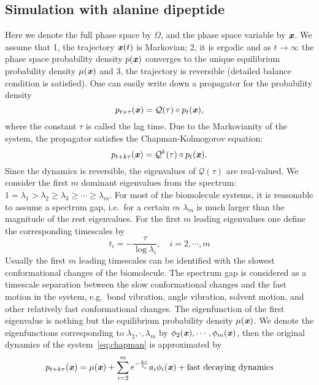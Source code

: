 \documentclass[aip,jcp,a4paper,preprint,unsortedaddress,onecolumn,fleqn]{revtex4-1}
\newcommand{\vect}[1]{\textbf{\textit{#1}}}
\begin{document}
\subsection{Simulation with alanine dipeptide}

Here we denote the full phase space by $\Omega$, and the phase space
variable by $\vect x$. We assume that 1, the trajectory $\vect x(t)$
is Markovian; 2, it is ergodic and as $t\rightarrow\infty$ the phase
space probability density $p(\vect x)$ converges to the unique
equilibrium probability density $\mu(\vect x)$ and 3, the trajectory
is reversible (detailed balance condition is satisfied). One can
easily write down a propagator for the probability density
\begin{equation}
\label{eq:propagator}  
p_{t+\tau}(\vect x) = \mathcal Q(\tau)\circ
p_t(\vect x),
\end{equation}
where the constant $\tau$ is called the lag time. Due to the
Markovianity of the system, the propagator satisfies the
Chapman-Kolmogorov equation:
\begin{equation}
  \label{eq:chapman}
  p_{t+k\tau}(\vect x) = \mathcal Q^k(\tau)\circ p_t(\vect x).
\end{equation}
Since the dynamics is reversible, the eigenvalues of $\mathcal
Q(\tau)$ are real-valued. We consider the first $m$ dominant
eigenvalues from the spectrum: $1 = \lambda_1 > \lambda_2 \geq
\lambda_3 \geq \cdots \geq \lambda_m$. For most of the biomolecule
systems, it is reasonable to assume a spectrum gap, i.e.~for a certain
$m$ $\lambda_m$ is much larger than the magnitude of the rest
eigenvalues. For the first $m$ leading eigenvalues one define the
corresponding timescales by
\begin{equation}
  \label{eq:timescale}
  t_i = -\frac{\tau}{\log \lambda_i}, \quad i= 2,\cdots, m
\end{equation}
Usually the first $m$ leading timescales can be identified with the
slowest conformational changes of the biomolecule. The spectrum gap is
considered as a timescale separation between the slow conformational
changes and the fast motion in the system, e.g.~bond vibration, angle
vibration, solvent motion, and other relatively fast conformational
changes. The eigenfunction of the first eigenvalue is nothing but the
equilibrium probability density $\mu(\vect x)$. We denote the
eigenfunctions corresponding to $\lambda_2, \cdot, \lambda_m$ by
$\phi_2(\vect x), \cdots, \phi_m(\vect x)$, then the original dynamics
of the system~\eqref{eq:chapman} is approximated by
\begin{equation}
  \label{eq:app-dynamics}
  p_{t+k\tau}(\vect x) = \mu(\vect x) + \sum_{i=2}^m e^{-\frac{k\tau}{t_i}} a_i \phi_i(\vect x) + \textrm{fast decaying dynamics}
\end{equation}
\end{document}
